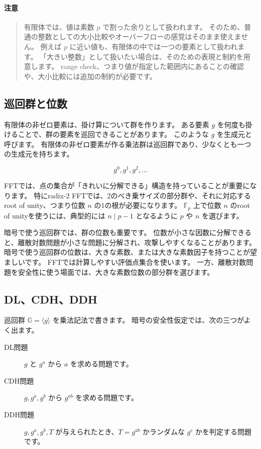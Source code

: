 \documentclass[a4paper,11pt]{ltjsarticle}
\newcommand{\F}{\mathbb{F}}
\newcommand{\G}{\mathbb{G}}
\newenvironment{warnbox}{%
  \paragraph*{注意}\begin{quote}
}{%
  \end{quote}
}
\begin{document}
\begin{warnbox}
有限体では、値は素数 \(p\) で割った余りとして扱われます。
そのため、普通の整数としての大小比較やオーバーフローの感覚はそのまま使えません。
例えば \(p\) に近い値も、有限体の中では一つの要素として扱われます。
「大きい整数」として扱いたい場合は、そのための表現と制約を用意します。
range check、つまり値が指定した範囲内にあることの確認や、大小比較には追加の制約が必要です。
\end{warnbox}

\subsection{巡回群と位数}

有限体の非ゼロ要素は、掛け算について群を作ります。
ある要素 \(g\) を何度も掛けることで、群の要素を巡回できることがあります。
このような \(g\) を生成元と呼びます。
有限体の非ゼロ要素が作る乗法群は巡回群であり、少なくとも一つの生成元を持ちます。

\[
  g^0, g^1, g^2, \ldots
\]

FFTでは、点の集合が「きれいに分解できる」構造を持っていることが重要になります。
特にradix-2 FFTでは、2のべき乗サイズの部分群や、それに対応するroot of unity、つまり位数 \(n\) の1の根が必要になります。
\(\F_p\) 上で位数 \(n\) のroot of unityを使うには、典型的には \(n\mid p-1\) となるように \(p\) や \(n\) を選びます。

暗号で使う巡回群では、群の位数も重要です。
位数が小さな因数に分解できると、離散対数問題が小さな問題に分解され、攻撃しやすくなることがあります。
暗号で使う巡回群の位数は、大きな素数、または大きな素数因子を持つことが望ましいです。
FFTでは計算しやすい評価点集合を使います。
一方、離散対数問題を安全性に使う場面では、大きな素数位数の部分群を選びます。

\subsection{DL、CDH、DDH}

巡回群 \(\G=\langle g\rangle\) を乗法記法で書きます。
暗号の安全性仮定では、次の三つがよく出ます。

\begin{description}
  \item[DL問題] \(g\) と \(g^a\) から \(a\) を求める問題です。
  \item[CDH問題] \(g,g^a,g^b\) から \(g^{ab}\) を求める問題です。
  \item[DDH問題] \(g,g^a,g^b,T\) が与えられたとき、\(T=g^{ab}\) かランダムな \(g^c\) かを判定する問題です。
\end{description}
\end{document}
